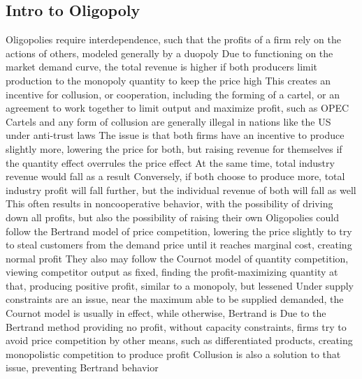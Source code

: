 \documentclass[11 pt, twoside]{article}
\newenvironment{outline*}
{
	\begin{outline}[enumerate]
	}
	{\end{outline}
}
\begin{document}
\subsection{Intro to Oligopoly}
\begin{outline*}
\1 Oligopolies require interdependence, such that the profits of a firm rely on the actions of others, modeled generally by a duopoly
\2 Due to functioning on the market demand curve, the total revenue is higher if both producers limit production to the monopoly quantity to keep the price high
\1 This creates an incentive for collusion, or cooperation, including the forming of a cartel, or an agreement to work together to limit output and maximize profit, such as OPEC
\2 Cartels and any form of collusion are generally illegal in nations like the US under anti-trust laws
\2 The issue is that both firms have an incentive to produce slightly more, lowering the price for both, but raising revenue for themselves if the quantity effect overrules the price effect
\3 At the same time, total industry revenue would fall as a result
\3 Conversely, if both choose to produce more, total industry profit will fall further, but the individual revenue of both will fall as well
\1 This often results in noncooperative behavior, with the possibility of driving down all profits, but also the possibility of raising their own
\1 Oligopolies could follow the Bertrand model of price competition, lowering the price slightly to try to steal customers from the demand price until it reaches marginal cost, creating normal profit
\2 They also may follow the Cournot model of quantity competition, viewing competitor output as fixed, finding the profit-maximizing quantity at that, producing positive profit, similar to a monopoly, but lessened
\2 Under supply constraints are an issue, near the maximum able to be supplied demanded, the Cournot model is usually in effect, while otherwise, Bertrand is
\3 Due to the Bertrand method providing no profit, without capacity constraints, firms try to avoid price competition by other means, such as differentiated products, creating monopolistic competition to produce profit
\3 Collusion is also a solution to that issue, preventing Bertrand behavior
\end{outline*}
\end{document}
